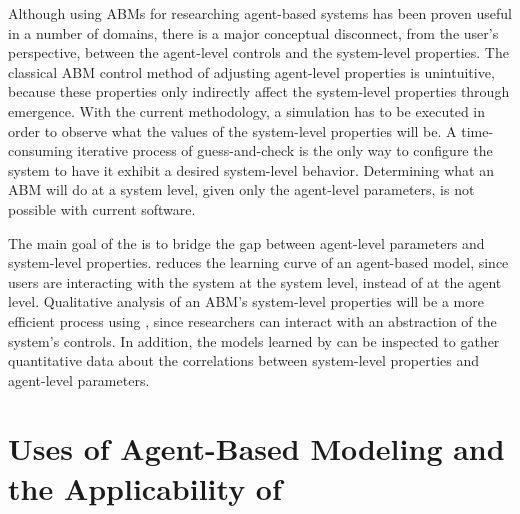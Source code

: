 Although using ABMs for researching agent-based systems has been proven useful in a number of domains, there is a major conceptual disconnect, from the user's perspective, between the agent-level controls and the system-level properties.
The classical ABM control method of adjusting agent-level properties is unintuitive, because these properties only indirectly affect the system-level properties through emergence.
With the current methodology, a simulation has to be executed in order to observe what the values of the system-level properties will be.
A time-consuming iterative process of guess-and-check is the only way to configure the system to have it exhibit a desired system-level behavior.
Determining what an ABM will do at a system level, given only the agent-level parameters, is not possible with current software.

The main goal of the \framework is to bridge the gap between agent-level parameters and system-level properties.
\fw reduces the learning curve of an agent-based model, since users are interacting with the system at the system level, instead of at the agent level.
Qualitative analysis of an ABM's system-level properties will be a more efficient process using \fw, since researchers can interact with an abstraction of the system's controls.
In addition, the models learned by \fw can be inspected to gather quantitative data about the correlations between system-level properties and agent-level parameters.

\section{Uses of Agent-Based Modeling and the Applicability of \fw}


